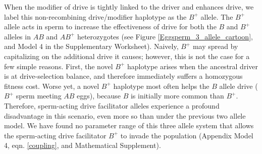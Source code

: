\documentclass[12pt,letterpaper]{article}
\begin{document}
When the modifier of drive is tightly linked to the driver and enhances drive, 
	we label  this non-recombining drive/modifier haplotype as the $B^+$ allele.  
The $B^+$ allele acts in sperm to increase the effectiveness of drive for both
	the $B$ and  $B^{+}$ alleles in $AB$ and $AB^{+}$ heterozygotes (see Figure \ref{Eggsperm_3_allele_cartoon}, and Model 4 in the Supplementary Worksheet). 
Naively, $B^{+}$ may spread by capitalizing on the additional drive it causes; however,  
	this is not the case for a few simple reasons. 
First, %
	the novel $B^{+}$ haplotype
	arises when the ancestral driver 
	is at drive-selection balance, 
	and therefore immediately suffers a homozygous fitness cost.  
Worse yet, a novel $B^{+}$ haplotype most often helps 
	the $B$  allele drive ($B^+$ sperm meeting $AB$ eggs), because $B$ is initially more common than $B^{+}$. 
Therefore, sperm-acting drive facilitator alleles experience a profound disadvantage 
	in this scenario, even more so than under the previous two allele model. 
We have found no parameter range of this
	three allele system that allows the sperm-acting drive facilitator $B^{+}$ to
	invade the population (Appendix Model 4, eqn. \eqref{coupling}, and Mathematical Supplement). 
\end{document}
